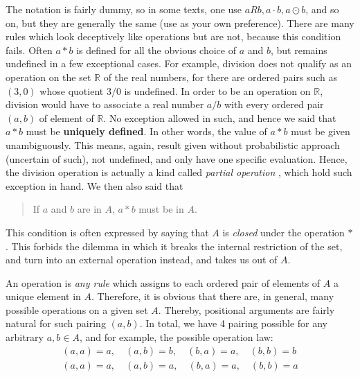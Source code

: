 The notation is fairly dummy, so in some texts, one use $aRb, a\cdot b, a\odot b$, and so on, but they are generally the same (use as your own preference). There are many rules which look deceptively like operations but are not, because this condition fails. Often $a*b$ is defined for all the obvious choice of $a$ and $b$, but remains undefined in a few exceptional cases. For example, division does not qualify as an operation on the set $\mathbb{R}$ of the real numbers, for there are ordered pairs such as $(3,0)$ whose quotient $3/0$ is undefined. In order to be an operation on $\mathbb{R}$, division would have to associate a real number $a/b$ with every ordered pair $(a,b)$ of element of $\mathbb{R}$. No exception allowed in such, and hence we said that $a*b$ must be \textbf{uniquely defined}. In other words, the value of $a*b$ must be given unambiguously. This means, again, result given without probabilistic approach (uncertain of such), not undefined, and only have one specific evaluation. Hence, the division operation is actually a kind called \textit{partial operation} , which hold such exception in hand. We then also said that
\begin{quote}
    If $a$ and $b$ are in $A$, $a*b$ must be in $A$. 
\end{quote}
This condition is often expressed by saying that $A$ is \textit{closed} under the operation $*$. This forbids the dilemma in which it breaks the internal restriction of the set, and turn into an external operation instead, and takes us out of $A$. 

An operation is \textit{any rule} which assigns to each ordered pair of elements of $A$ a unique element in $A$. Therefore, it is obvious that there are, in general, many possible operations on a given set $A$. Thereby, positional arguments are fairly natural for such pairing $(a,b)$. In total, we have 4 pairing possible for any arbitrary $a,b\in A$, and for example, the possible operation law: 
\begin{align}
    (a,a) = a ,\quad (a,b) = b , \quad (b,a) = a , \quad (b,b) = b \\
    (a,a) = a ,\quad (a,b) = a , \quad (b,a) = a , \quad (b,b) = a
\end{align}

